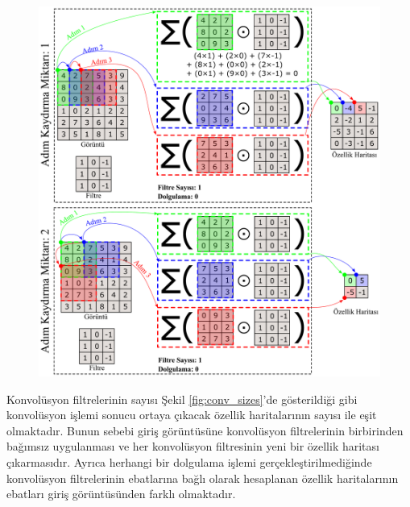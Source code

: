 \begin{figure}[h!]
	\begin{center}
		\vspace{0.4cm}
		{
			\vspace{0.4cm}
			\includegraphics[scale=0.3]{Yapilan-Calismalar/Figures/conv2D2.pdf}
		}
	\end{center}
\end{figure}

Konvolüsyon filtrelerinin sayısı Şekil \ref{fig:conv_sizes}'de gösterildiği gibi konvolüsyon işlemi sonucu ortaya çıkacak özellik haritalarının sayısı ile eşit olmaktadır. Bunun sebebi giriş görüntüsüne konvolüsyon filtrelerinin birbirinden bağımsız uygulanması ve her konvolüsyon filtresinin yeni bir özellik haritası çıkarmasıdır. Ayrıca herhangi bir dolgulama işlemi gerçekleştirilmediğinde konvolüsyon filtrelerinin ebatlarına bağlı olarak hesaplanan özellik haritalarının ebatları giriş görüntüsünden farklı olmaktadır. 

